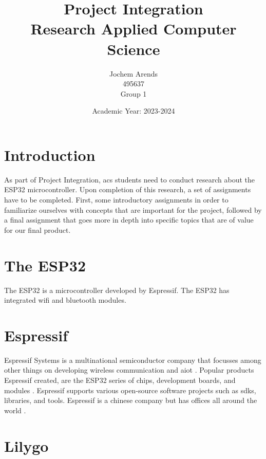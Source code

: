 \documentclass{article}
\title{Project Integration \\ Research Applied Computer Science}
\author{Jochem Arends \\ 495637 \\ Group 1}
\date{Academic Year: 2023-2024}
\begin{document}
\maketitle
\newpage

\tableofcontents
\clearpage

\printglossary[type=\acronymtype,{title=Abbreviations}]
\printglossary[type=main]
\clearpage

\section{Introduction}
As part of Project Integration, \gls{acs} students need to conduct research about the ESP32 microcontroller.
Upon completion of this research, a set of assignments have to be completed.
First, some introductory assignments in order to familiarize ourselves with concepts that are important for the project, followed by a final assignment that goes more in depth into specific topics that are of value for our final product.

\section{The ESP32}
The ESP32 is a microcontroller developed by Espressif.
The ESP32 has integrated \gls{wifi} and \gls{bluetooth} modules.

\section{Espressif}
Espressif Systems is a multinational semiconductor company that focusses among other things on developing wireless communication and \gls{aiot} \cite{aboutespressif}.
Popular products Espressif created, are the ESP32 series of chips, development boards, and modules \cite{aboutespressif}.
Espressif supports various open-source software projects such as \glspl{sdk}, libraries, and tools.
Espressif is a chinese company but has offices all around the world \cite{aboutespressif}.

\section {Lilygo}


\clearpage








\end{document}
